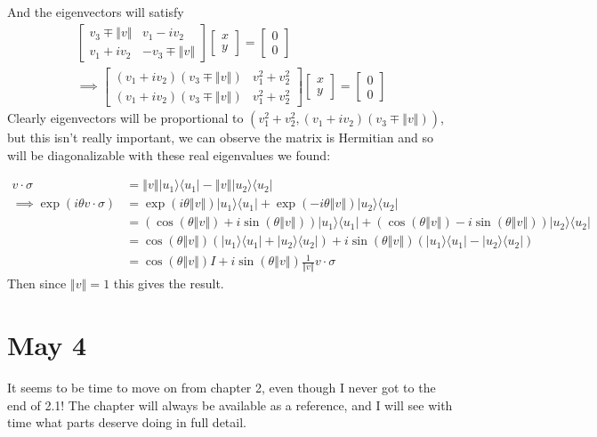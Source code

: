 \documentclass[]{article}
\newcommand{\bra}[1]{\langle #1 |}
\newcommand{\ket}[1]{| #1 \rangle}
\newcommand{\norm}[1]{\left\Vert #1 \right\Vert}
\begin{document}
And the eigenvectors will satisfy
\begin{align*}
\left[\begin{matrix}
v_3\mp\norm{v} & v_1-iv_2\\
v_1+iv_2 & -v_3\mp\norm{v}
\end{matrix}\right]
\left[\begin{matrix}
x\\
y
\end{matrix}\right]
=
\left[\begin{matrix}
0\\
0
\end{matrix}\right]
\\\implies
\left[\begin{matrix}
(v_1+iv_2)(v_3\mp\norm{v}) & v_1^2+v_2^2\\
(v_1+iv_2)(v_3\mp\norm{v}) & v_1^2+v_2^2
\end{matrix}\right]
\left[\begin{matrix}
x\\
y
\end{matrix}\right]
=
\left[\begin{matrix}
0\\
0
\end{matrix}\right]
\end{align*}
Clearly eigenvectors will be proportional to $(v_1^2+v_2^2, (v_1+iv_2)(v_3\mp\norm{v}))$, but this isn't really important, we can observe the matrix is Hermitian and so will be diagonalizable with these real eigenvalues we found:

\begin{align*}
v\cdot \sigma
&= \norm{v}\ket{u_1}\bra{u_1} - \norm{v}\ket{u_2}\bra{u_2}
\\\implies \exp(i\theta v\cdot \sigma)
&= \exp(i\theta \norm{v}) \ket{u_1}\bra{u_1}
 + \exp(- i\theta \norm{v})\ket{u_2}\bra{u_2}
\\&= (\cos(\theta \norm{v})+i\sin(\theta\norm{v})) \ket{u_1}\bra{u_1}
 + (\cos(\theta \norm{v})-i\sin(\theta\norm{v}))\ket{u_2}\bra{u_2}
\\&= \cos(\theta \norm{v})(\ket{u_1}\bra{u_1}  + \ket{u_2}\bra{u_2})
 + i\sin(\theta\norm{v}) (\ket{u_1}\bra{u_1} - \ket{u_2}\bra{u_2})
\\&= \cos(\theta \norm{v})I
 + i\sin(\theta\norm{v}) \frac{1}{\norm{v}} v\cdot\sigma
\end{align*}
Then since $\norm{v}=1$ this gives the result.

\section{May 4}
It seems to be time to move on from chapter 2, even though I never got to the end of 2.1! The chapter will always be available as a reference, and I will see with time what parts deserve doing in full detail.
\end{document}
